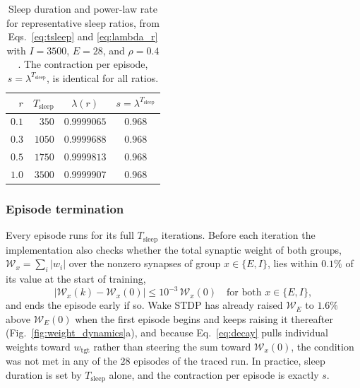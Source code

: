 \begin{table}[h!]
\centering
\caption{Sleep duration and power-law rate for representative sleep ratios, from Eqs.~\eqref{eq:tsleep} and \eqref{eq:lambda_r} with $I = 3500$, $E = 28$, and $\rho = 0.4$. The contraction per episode, $s = \lambda^{T_{\mathrm{sleep}}}$, is identical for all ratios.}
\label{tab:lambda_r}
\begin{tabular}{rrcc}
\toprule
$r$ & $T_{\mathrm{sleep}}$ & $\lambda(r)$ & $s = \lambda^{T_{\mathrm{sleep}}}$ \\
\midrule
$0.1$ & $350$  & $0.9999065$ & $0.968$ \\
$0.3$ & $1050$ & $0.9999688$ & $0.968$ \\
$0.5$ & $1750$ & $0.9999813$ & $0.968$ \\
$1.0$ & $3500$ & $0.9999907$ & $0.968$ \\
\bottomrule
\end{tabular}
\end{table}

\subsubsection{Episode termination}

Every episode runs for its full $T_{\mathrm{sleep}}$ iterations. Before each iteration the implementation also checks whether the total synaptic weight of both groups, $\mathcal{W}_x = \sum_i |w_i|$ over the nonzero synapses of group $x \in \{E, I\}$, lies within $0.1\%$ of its value at the start of training,
\begin{equation}
\left|\mathcal{W}_x(k) - \mathcal{W}_x(0)\right| \leq 10^{-3}\, \mathcal{W}_x(0) \quad \text{for both } x \in \{E, I\},
\label{eq:wakeup}
\end{equation}
and ends the episode early if so. Wake STDP has already raised $\mathcal{W}_E$ to $1.6\%$ above $\mathcal{W}_E(0)$ when the first episode begins and keeps raising it thereafter (Fig.~\ref{fig:weight_dynamics}a), and because Eq.~\eqref{eq:decay} pulls individual weights toward $w_{\mathrm{tgt}}$ rather than steering the sum toward $\mathcal{W}_x(0)$, the condition was not met in any of the $28$ episodes of the traced run. In practice, sleep duration is set by $T_{\mathrm{sleep}}$ alone, and the contraction per episode is exactly $s$.

